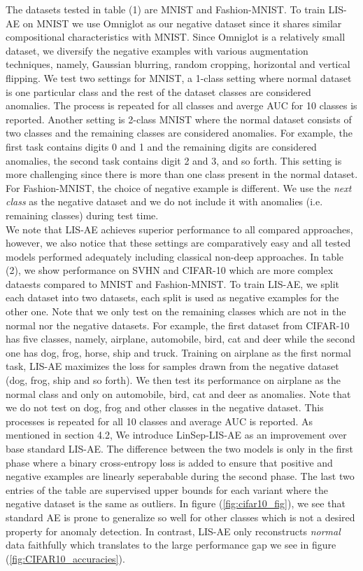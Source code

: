 \documentclass[acmtog, nonacm]{acmart}
\begin{document}
The datasets tested in table (1) are MNIST and Fashion-MNIST. To train LIS-AE on MNIST we use Omniglot \cite{lake2015human} as our negative dataset since it shares similar compositional characteristics with MNIST. Since Omniglot is a relatively small dataset, we diversify the negative examples with various augmentation techniques, namely, Gaussian blurring, random cropping, horizontal and vertical flipping. We test two settings for MNIST, a 1-class setting where normal dataset is one particular class and the rest of the dataset classes are considered anomalies. The process is repeated for all classes and averge AUC for 10 classes is reported. Another setting is 2-class MNIST where the normal dataset consists of two classes and the remaining classes are considered anomalies. For example, the first task contains digits 0 and 1 and the remaining digits are considered anomalies, the second task contains digit 2 and 3, and so forth. This setting is more challenging since there is more than one class present in the normal dataset. 
For Fashion-MNIST, the choice of negative example is different. We use the \textit{next class} as the negative dataset and we do not include it with anomalies (i.e. remaining classes) during test time.
\\
We note that LIS-AE achieves superior performance to all compared approaches, however, we also notice that these settings are comparatively easy and all tested models performed adequately including classical non-deep approaches.
\noindent
In table (2), we show performance on SVHN and CIFAR-10 which are more complex dataests compared to MNIST and Fashion-MNIST. To train LIS-AE, we split each dataset into two datasets, each split is used as negative examples for the other one. Note that we only test on the remaining classes which are not in the normal nor the negative datasets. For example, the first dataset from CIFAR-10 has five classes, namely, airplane, automobile, bird, cat and deer while the second one has dog, frog, horse, ship and truck.
Training on airplane as the first normal task, LIS-AE maximizes the loss for samples drawn from the negative dataset (dog, frog, ship and so forth). We then test its performance on airplane as the normal class and only on automobile, bird, cat and deer as anomalies. Note that we do not test on dog, frog and other classes in the negative dataset. This processes is repeated for all 10 classes and average AUC is reported. As mentioned in section 4.2, We introduce LinSep-LIS-AE as an improvement over base standard LIS-AE. The difference between the two models is only in the first phase where a binary cross-entropy loss is added to ensure that positive and negative examples are linearly seperabable during the second phase. The last two entries of the table are supervised upper bounds for each variant where the negative dataset is the same as outliers. In figure (\ref{fig:cifar10_fig}), we see that standard AE is prone to generalize so well for other classes which is not a desired property for anomaly detection. In contrast, LIS-AE only reconstructs \textit{normal} data faithfully which translates to the large performance gap we see in figure (\ref{fig:CIFAR10_accuracies}).
\end{document}
